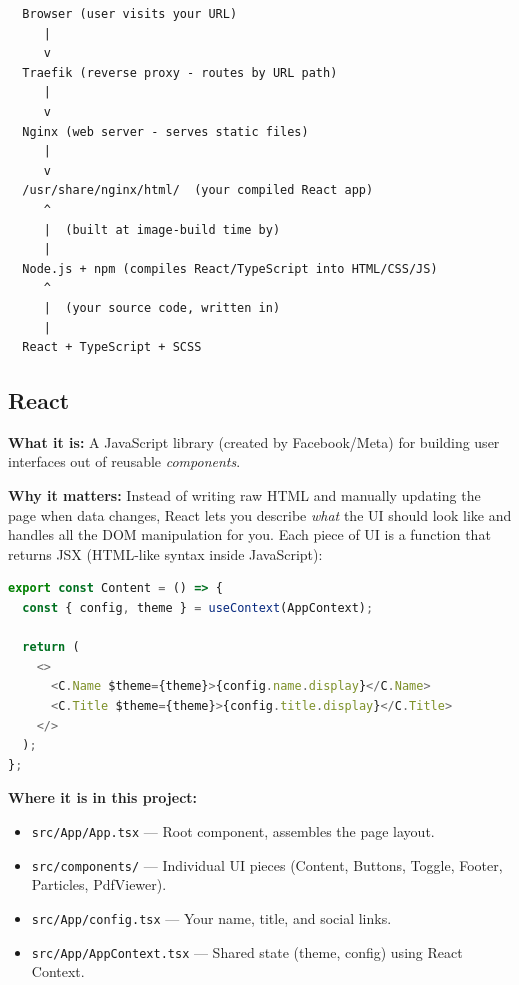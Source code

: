 \documentclass[11pt, letterpaper]{article}
\begin{document}
\begin{center}
\begin{tcolorbox}[
  colback=codeGray,
  colframe=codeBorder,
  width=0.95\textwidth,
  arc=2pt,
  boxrule=0.5pt,
]
\begin{verbatim}
  Browser (user visits your URL)
     |
     v
  Traefik (reverse proxy - routes by URL path)
     |
     v
  Nginx (web server - serves static files)
     |
     v
  /usr/share/nginx/html/  (your compiled React app)
     ^
     |  (built at image-build time by)
     |
  Node.js + npm (compiles React/TypeScript into HTML/CSS/JS)
     ^
     |  (your source code, written in)
     |
  React + TypeScript + SCSS
\end{verbatim}
\end{tcolorbox}
\end{center}

\subsection{React}

\textbf{What it is:} A JavaScript library (created by Facebook/Meta) for
building user interfaces out of reusable \textit{components}.

\textbf{Why it matters:} Instead of writing raw HTML and manually updating the
page when data changes, React lets you describe \textit{what} the UI should
look like and handles all the DOM manipulation for you. Each piece of UI is a
function that returns JSX (HTML-like syntax inside JavaScript):

\begin{lstlisting}[style=code, language=JavaScript, caption={src/components/Content.tsx --- A React component}]
export const Content = () => {
  const { config, theme } = useContext(AppContext);

  return (
    <>
      <C.Name $theme={theme}>{config.name.display}</C.Name>
      <C.Title $theme={theme}>{config.title.display}</C.Title>
    </>
  );
};
\end{lstlisting}

\textbf{Where it is in this project:}
\begin{itemize}[nosep]
  \item \texttt{src/App/App.tsx} --- Root component, assembles the page layout.
  \item \texttt{src/components/} --- Individual UI pieces (Content, Buttons,
        Toggle, Footer, Particles, PdfViewer).
  \item \texttt{src/App/config.tsx} --- Your name, title, and social links.
  \item \texttt{src/App/AppContext.tsx} --- Shared state (theme, config) using
        React Context.
\end{itemize}
\end{document}
